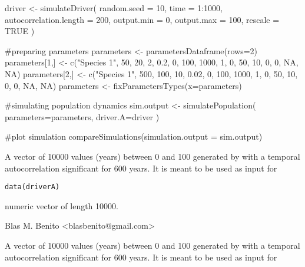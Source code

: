 \documentclass[letterpaper]{book}
\begin{document}
%
\begin{Examples}
\begin{ExampleCode}

driver <- simulateDriver(
 random.seed = 10,
 time = 1:1000,
 autocorrelation.length = 200,
 output.min = 0,
 output.max = 100,
 rescale = TRUE
 )

#preparing parameters
parameters <- parametersDataframe(rows=2)
parameters[1,] <- c("Species 1", 50, 20, 2, 0.2, 0, 100, 1000, 1, 0, 50, 10, 0, 0, NA, NA)
parameters[2,] <- c("Species 1", 500, 100, 10, 0.02, 0, 100, 1000, 1, 0, 50, 10, 0, 0, NA, NA)
parameters <- fixParametersTypes(x=parameters)

#simulating population dynamics
sim.output <- simulatePopulation(
 parameters=parameters,
 driver.A=driver
 )

#plot simulation
compareSimulations(simulation.output = sim.output)

\end{ExampleCode}
\end{Examples}
%
\begin{Description}\relax
A vector of 10000 values (years) between 0 and 100 generated by  with a temporal autocorrelation significant for 600 years. It is meant to be used as input for 
\end{Description}
%
\begin{Usage}
\begin{verbatim}
data(driverA)
\end{verbatim}
\end{Usage}
%
\begin{Format}
numeric vector of length 10000.
\end{Format}
%
\begin{Author}\relax
Blas M. Benito  <blasbenito@gmail.com>
\end{Author}
%
\begin{SeeAlso}\relax
{}
\end{SeeAlso}
%
\begin{Description}\relax
A vector of 10000 values (years) between 0 and 100 generated by  with a temporal autocorrelation significant for 600 years. It is meant to be used as input for 
\end{Description}
\end{document}
